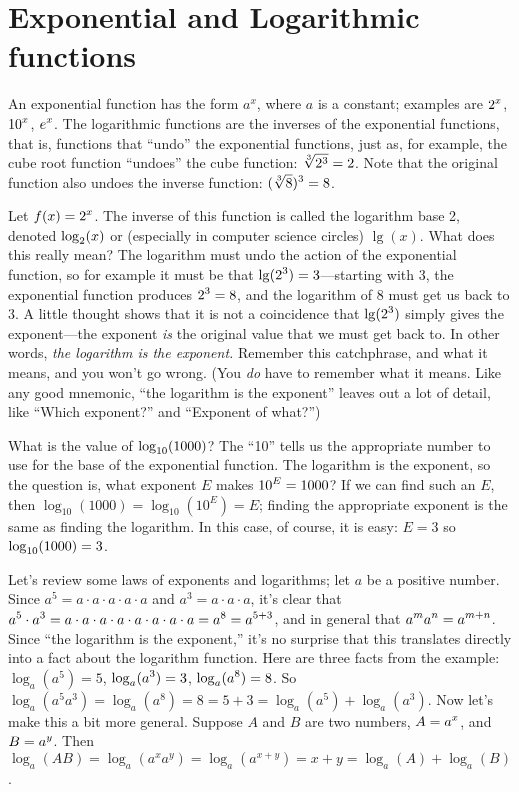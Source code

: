 \section{Exponential and Logarithmic functions}{}{}
\nobreak
An exponential function has the form
$a^x$, where $a$ is a constant; examples are $\displaystyle 2^x$, $\displaystyle 10^x$, $\displaystyle e^x$. The
logarithmic functions are
the {\dfont inverses\/} of the exponential
functions, that is, functions that ``undo'' the exponential functions,
just as, for example, the cube root function ``undoes'' the cube
function: $\ds \root3\of{2^3}=2$. Note that the original function also
undoes the inverse function: $\ds (\root3\of{8})^3=8$.

Let $\displaystyle f(x)=2^x$. The inverse of this function is called the
logarithm base 2, denoted $\displaystyle \log_2(x)$ or (especially in computer
science circles) $\lg(x)$. What does this really mean? The logarithm
must undo the action of the exponential function, so for example it
must be that $\displaystyle \lg(2^3)=3$---starting with 3, the exponential function
produces $\displaystyle 2^3=8$, and the logarithm of 8 must get us back to 3. A
little thought shows that it is not a coincidence that $\displaystyle \lg(2^3)$
simply gives the exponent---the exponent {\em is\/} the original value
that we must get back to. In other words, {\em the logarithm is the
  exponent.} Remember this catchphrase, and what it means, and you
won't go wrong. (You {\em do\/} have to remember what it means. Like
any good mnemonic, ``the logarithm is the exponent'' leaves out a lot
of detail, like ``Which exponent?'' and ``Exponent of what?'')

\example
What is the value of $\displaystyle \log_{10}(1000)$? The ``10'' tells us the
appropriate number to use for the base of the exponential
function. The logarithm is the exponent, so the question is, what
exponent $E$ makes $\displaystyle 10^E=1000$? If we can find such an $E$, then
$\log_{10}(1000)=\log_{10}(10^E)=E$; finding the appropriate exponent
is the same as finding the logarithm. In this case, of course, it is
easy: $E=3$ so $\displaystyle \log_{10}(1000)=3$.
\endexample

Let's review some laws of exponents and logarithms; let $a$ be a
positive number. Since 
$a^5=a\cdot a\cdot a\cdot a\cdot a$ and 
$a^3=a\cdot a\cdot a$, it's clear that $\displaystyle a^5\cdot a^3 =
a\cdot a\cdot a\cdot a\cdot a\cdot a\cdot a\cdot a = a^8 = a^{5+3}$,
and in general that $\displaystyle a^ma^n=a^{m+n}$. Since ``the logarithm is the
exponent,'' it's no surprise that this translates directly into a fact
about the logarithm function. Here are three facts from the example:
$\log_a(a^5)=5$, $\displaystyle \log_a(a^3)=3$, $\displaystyle \log_a(a^8)=8$. So
$\log_a(a^5a^3)=\log_a(a^8)=8 = 5+3=\log_a(a^5)+\log_a(a^3)$. Now
let's make this a bit more general. Suppose $A$ and $B$ are two
numbers, $\displaystyle A=a^x$, and $\displaystyle B=a^y$. Then
$\log_a(AB)=\log_a(a^xa^y)=\log_a(a^{x+y})=x+y=\log_a(A)+\log_a(B)$.

